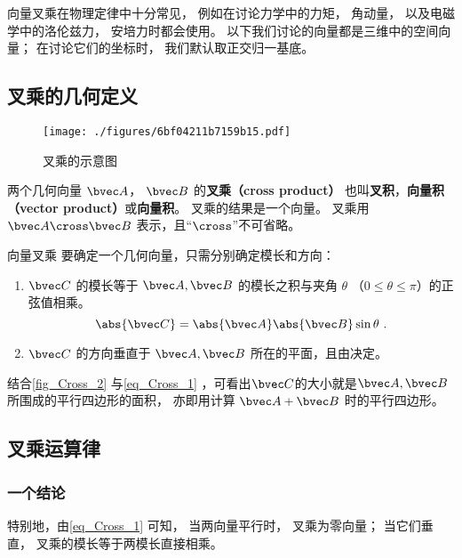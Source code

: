 

向量叉乘在物理定律中十分常见， 例如在讨论力学中的力矩， 角动量， 以及电磁学中的洛伦兹力， 安培力时都会使用。 以下我们讨论的向量都是三维中的空间向量； 在讨论它们的坐标时， 我们默认取正交归一基底。

\subsection{叉乘的几何定义}

\begin{figure}[ht]
\centering
\texttt{[image: ./figures/6bf04211b7159b15.pdf]}
\caption{叉乘的示意图} \label{fig_Cross_2}
\end{figure}

两个几何向量 $\bvec A$，  $\bvec B$ 的\textbf{叉乘（cross product）} 也叫\textbf{叉积}，\textbf{向量积（vector product）}或\textbf{向量积}。 叉乘的结果是一个向量。  叉乘用 $\bvec A \cross \bvec B$ 表示，且“$\cross$”不可省略。

\begin{definition}{向量叉乘}\label{def_Cross_1}
要确定一个几何向量，只需分别确定模长和方向：
\begin{enumerate}
\item $\bvec C$ 的模长等于 $\bvec A, \bvec B$ 的模长之积与夹角 $\theta$ （$0 \leqslant \theta \leqslant \pi$）的正弦值相乘。
\begin{equation}\label{eq_Cross_1}
\abs{\bvec C}  = \abs{\bvec A} \abs{\bvec B} \sin\theta ~.
\end{equation}
\item $\bvec C$ 的方向垂直于 $\bvec A, \bvec B$ 所在的平面，且由决定。
\end{enumerate}
\end{definition}

结合\autoref{fig_Cross_2} 与\autoref{eq_Cross_1} ，可看出$\bvec C$的大小就是$\bvec A, \bvec B$所围成的平行四边形的面积， 亦即用计算 $\bvec A + \bvec B$ 时的平行四边形。

\subsection{叉乘运算律}
\subsubsection{一个结论}
特别地，由\autoref{eq_Cross_1} 可知， 当两向量平行时， 叉乘为零向量； 当它们垂直， 叉乘的模长等于两模长直接相乘。%

